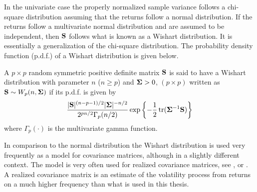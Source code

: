 \documentclass[12pt, oneside]{book}\usepackage{knitr}
\begin{document}
In the univariate case the properly normalized sample variance follows a chi-square distribution assuming that the returns follow a normal distribution. 
If the returns follow a multivariate normal distribution and are assumed to be independent, then $\mathbf{S}$ follows what is known as a Wishart distribution. 
It is essentially a generalization of the chi-square distribution. 
The probability density function (p.d.f.) of a Wishart distribution is given below.
\begin{definition}\label{def:wishart}
	A $p\times p$ random symmetric positive definite matrix $\mathbf{S}$ is said to have a Wishart distribution with parameter $n$ ($n\geq p$) and $\mathbf{\Sigma} > 0$, $(p \times p)$ written as $\mathbf{S} \sim W_p(n, \mathbf{\Sigma})$ if its p.d.f. is given by
	\begin{equation}\label{eqn:wishart_density}
  	\frac{|\mathbf{S}|^{(n-p-1)/2} |\mathbf{\Sigma}|^{- n/2} }{2^{pn/2} \Gamma_p (n/2) } \exp\left\{-\frac{1}{2} \operatorname{tr}(\mathbf{\Sigma}^{-1}\mathbf{S})  \right\}
	\end{equation}
	where $ \Gamma_p (\cdot) $ is the multivariate gamma function.
\end{definition}
In comparison to the normal distribution the Wishart distribution is used very frequently as a model for covariance matrices, although in a slightly different context.
The model is very often used for realized covariance matrices, see \citet{barndorff2004econometric}, \citet{golosnoy2019exponential} or \citet{alfelt2021modeling}.
A realized covariance matrix is an estimate of the volatility process from returns on a much higher frequency than what is used in this thesis.
\end{document}
